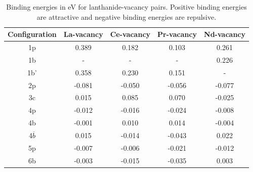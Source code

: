 \documentclass[preprint,12pt]{elsarticle}
\begin{document}
\begin{table}[h!]
    \centering
    \caption{Binding energies in eV for lanthanide-vacancy pairs. Positive binding energies are attractive and negative binding energies are repulsive.}
    \label{tab:BE}
    \begin{tabular}{c|c|c|c|c}
        \toprule
       Configuration & La-vacancy & Ce-vacancy & Pr-vacancy & Nd-vacancy  \\
       \hline
       1p &0.389 &0.182 &0.103 &0.261 \\
       1b &- &- &- &0.226 \\
       1b' &0.358 &0.230 &0.151 &- \\
       2p &-0.081 &-0.050 &-0.056 &-0.077 \\
       3c &0.015 &0.085 &0.070 &-0.025 \\
       4p &-0.012 &-0.016 &-0.024 &-0.008 \\
       4b &-0.001 &0.010 &0.014 &-0.004 \\
       4$\overline{b}$ &0.015 &-0.014 &-0.043 &0.022 \\
       5p &-0.007 &-0.006 &-0.021 &-0.012 \\
       6b &-0.003 &-0.015 &-0.035 &0.003 \\
       \bottomrule
    \end{tabular}
\end{table}
\end{document}
